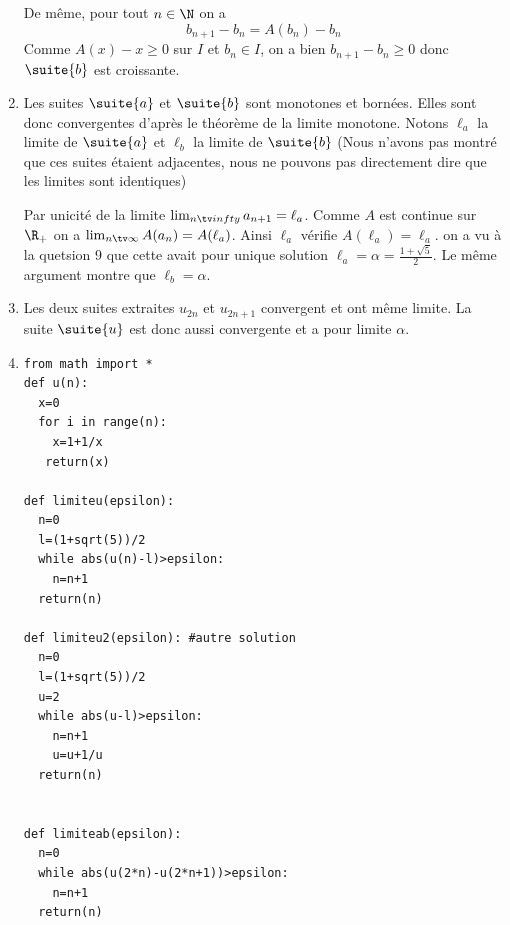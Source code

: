 \begin{correction}
\begin{enumerate}
De même, pour tout $n\in \N$ on  a 
$$b_{n+1}-b_n= A(b_n)-b_n$$
Comme $ A(x)-x\geq 0 $ sur $I$ et $b_n\in I$, on a bien $b_{n+1}-b_{n}\geq 0$ donc $\suite{b}$ est croissante. 


\item Les suites $\suite{a}$ et $\suite{b}$ sont monotones et bornées. Elles sont donc convergentes d'après le théorème de la limite monotone. Notons $\ell_a$ la limite de $\suite{a}$ et $\ell_b$ la limite de $\suite{b}$ (Nous n'avons pas montré que ces suites étaient adjacentes, nous ne pouvons pas directement dire que les limites sont identiques) 

Par unicité de la limite $\lim_{n\tv infty } a_{n+1}=\ell_a$. Comme $A$ est continue sur $\R_+$ on a $\lim_{n\tv \infty} A(a_n)  = A(\ell_a)$. Ainsi $\ell_a$ vérifie $A(\ell_a) = \ell_a$. on a vu à la quetsion  9 que cette avait pour unique solution $\ell_a=\alpha= \frac{1+\sqrt{5}}{2}$. Le même argument montre que $\ell_b =\alpha$. 

\item Les deux suites extraites $u_{2n}$ et $u_{2n+1}$ convergent et ont même limite. La suite $\suite{u}$ est donc aussi convergente et a pour limite $\alpha$. 


\item 
\begin{lstlisting}
from math import *
def u(n):
  x=0
  for i in range(n):
    x=1+1/x
   return(x)

def limiteu(epsilon):
  n=0
  l=(1+sqrt(5))/2
  while abs(u(n)-l)>epsilon:
    n=n+1
  return(n)
  
def limiteu2(epsilon): #autre solution
  n=0
  l=(1+sqrt(5))/2
  u=2
  while abs(u-l)>epsilon:
    n=n+1
    u=u+1/u
  return(n)
  

def limiteab(epsilon):
  n=0
  while abs(u(2*n)-u(2*n+1))>epsilon:
    n=n+1
  return(n)
\end{lstlisting}

\end{enumerate}
\end{correction}










